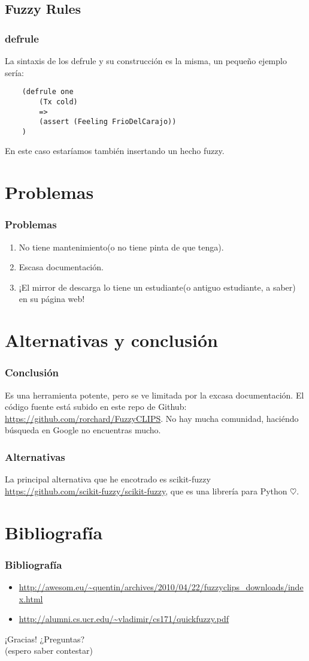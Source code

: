 \documentclass{beamer}
\begin{document}
\subsection{Fuzzy Rules}
\begin{frame}[fragile]
	\frametitle{defrule}
	La sintaxis de los defrule y su construcción es la misma, un pequeño ejemplo sería:
	\begin{verbatim}
	(defrule one
	    (Tx cold)
	    =>
	    (assert (Feeling FrioDelCarajo))
	)
	\end{verbatim}
	En este caso estaríamos también insertando un hecho fuzzy.
\end{frame}

\section{Problemas}

\begin{frame}
	\frametitle{Problemas}
	\begin{enumerate}
		\item No tiene mantenimiento(o no tiene pinta de que tenga).
		\item Escasa documentación.
		\item ¡El mirror de descarga lo tiene un estudiante(o antiguo estudiante, a saber) en su página web!
	\end{enumerate}
\end{frame}

\section{Alternativas y conclusión}
\begin{frame}
	\frametitle{Conclusión}
	Es una herramienta potente, pero se ve limitada por la excasa documentación. El código fuente está subido en este repo de Github: \url{https://github.com/rorchard/FuzzyCLIPS}. No hay mucha comunidad, haciéndo búsqueda en Google no encuentras mucho.
\end{frame}
\begin{frame}[fragile]
	\frametitle{Alternativas}
	La principal alternativa que he encotrado es scikit-fuzzy \url{https://github.com/scikit-fuzzy/scikit-fuzzy}, que es una librería para Python $\heartsuit$.
\end{frame}
\section{Bibliografía}
\begin{frame}
	\frametitle{Bibliografía}
	\begin{itemize}
		\item \url{http://awesom.eu/~quentin/archives/2010/04/22/fuzzyclips_downloads/index.html}
		\item \url{http://alumni.cs.ucr.edu/~vladimir/cs171/quickfuzzy.pdf}
	\end{itemize}
\end{frame}
\begin{frame}
	\huge \centering ¡Gracias! ¿Preguntas? \\
	\normalsize (espero saber contestar)
\end{frame}
\end{document}
